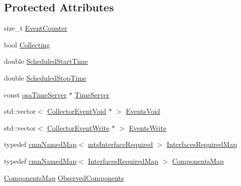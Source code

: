 \subsection*{Protected Attributes}
\begin{DoxyCompactItemize}
\item 
size\+\_\+t \hyperlink{classmts_collector_event_a1249f64f2e4e0f3686ee6785bb8b1740}{Event\+Counter}
\item 
bool \hyperlink{classmts_collector_event_ae9292be0812681c2a314e048a0a4f0a5}{Collecting}
\item 
double \hyperlink{classmts_collector_event_a16f82074f7e622b72a100c8c99c1354e}{Scheduled\+Start\+Time}
\item 
double \hyperlink{classmts_collector_event_ad7213ee6804878731b6d0d7effa3dd0a}{Scheduled\+Stop\+Time}
\item 
const \hyperlink{classosa_time_server}{osa\+Time\+Server} $\ast$ \hyperlink{classmts_collector_event_a0bf692d3a1e6c8eb40b4ae32053dba2e}{Time\+Server}
\end{DoxyCompactItemize}
{\bf }\par
\begin{DoxyCompactItemize}
\item 
std\+::vector$<$ \hyperlink{classmts_collector_event_1_1_collector_event_void}{Collector\+Event\+Void} $\ast$ $>$ \hyperlink{classmts_collector_event_a5c71a9d9e4ebcd24d5b72c096aa48615}{Events\+Void}
\item 
std\+::vector$<$ \hyperlink{classmts_collector_event_1_1_collector_event_write}{Collector\+Event\+Write} $\ast$ $>$ \hyperlink{classmts_collector_event_a6924ca78e61980e8079b5957e7648ad7}{Events\+Write}
\end{DoxyCompactItemize}

\begin{DoxyCompactItemize}
\item 
typedef \hyperlink{classcmn_named_map}{cmn\+Named\+Map}$<$ \hyperlink{classmts_interface_required}{mts\+Interface\+Required} $>$ \hyperlink{classmts_collector_event_ac8f5ef3f2d36cef5c1dc78cb35fc79bd}{Interfaces\+Required\+Map}
\item 
typedef \hyperlink{classcmn_named_map}{cmn\+Named\+Map}$<$ \hyperlink{classmts_collector_event_ac8f5ef3f2d36cef5c1dc78cb35fc79bd}{Interfaces\+Required\+Map} $>$ \hyperlink{classmts_collector_event_a06ae73259368d52dfbde74f94a3b1dfb}{Components\+Map}
\item 
\hyperlink{classmts_collector_event_a06ae73259368d52dfbde74f94a3b1dfb}{Components\+Map} \hyperlink{classmts_collector_event_a0f4a7cc03d7c29dc4b853fc248415578}{Observed\+Components}
\end{DoxyCompactItemize}

